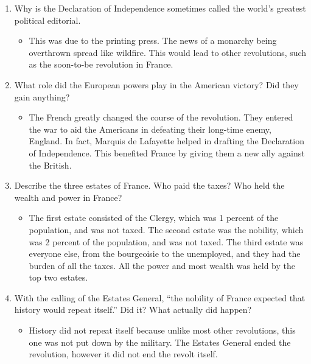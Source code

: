 \documentclass[12pt]{article}
\begin{document}
\begin{enumerate}
\item Why is the Declaration of Independence sometimes called the world's greatest political editorial.

	\begin{itemize}
	\item This was due to the printing press. The news of a monarchy being overthrown spread like wildfire. This would lead to other revolutions, such as the soon-to-be revolution in France.
	\end{itemize}

\item What role did the European powers play in the American victory? Did they gain anything?

	\begin{itemize}
	\item The French greatly changed the course of the revolution. They entered the war to aid the Americans in defeating their long-time enemy, England. In fact, Marquis de Lafayette helped in drafting the Declaration of Independence. This benefited France by giving them a new ally against the British.
	\end{itemize}

\item Describe the three estates of France. Who paid the taxes? Who held the wealth and power in France?

	\begin{itemize}
	\item The first estate consisted of the Clergy, which was 1 percent of the population, and was not taxed. The second estate was the nobility, which was 2 percent of the population, and was not taxed. The third estate was everyone else, from the bourgeoisie to the unemployed, and they had the burden of all the taxes. All the power and most wealth was held by the top two estates.
	\end{itemize}

\item With the calling of the Estates General, ``the nobility of France expected that history would repeat itself.'' Did it? What actually did happen?

	\begin{itemize}
	\item History did not repeat itself because unlike most other revolutions, this one was not put down by the military. The Estates General ended the revolution, however it did not end the revolt itself. 
	\end{itemize}


\end{enumerate}
\end{document}
